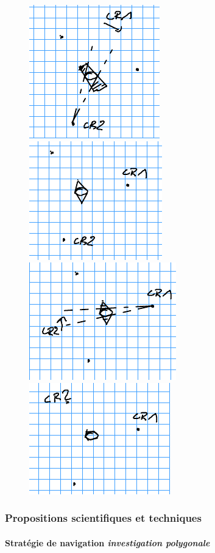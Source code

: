 \documentclass{beamer}
\begin{document}
\begin{frame}
\begin{figure}
					\includegraphics[height=0.2\linewidth]{graphics/triangle_4.png}
					\includegraphics[height=0.2\linewidth]{graphics/triangle_5.png}
					\includegraphics[height=0.2\linewidth]{graphics/triangle_6.png}
					\includegraphics[height=0.2\linewidth]{graphics/triangle_7.png}
				\end{figure}
			\end{frame}
			\begin{frame}
				\frametitle{Propositions scientifiques et techniques}
				\framesubtitle{Stratégie de navigation \textit{investigation polygonale}}
				\begin{figure}[H]
					\centering
				\end{figure}
			\end{frame}
\end{document}
